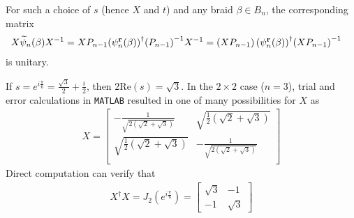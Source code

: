 For such a choice of $s$ (hence $X$ and $t$) and any braid $\beta\in B_n$, the corresponding matrix
\begin{align*}
    X\widetilde{\psi}_n(\beta){ X }^{-1} &= X P_{n-1}{\left(\psi_n^\mathbf{r}(\beta)\right)}^\dagger{ \left( P_{n-1} \right) }^{-1}{ X }^{-1} = \left( X P_{n-1} \right){\left(\psi_n^\mathbf{r}(\beta)\right)}^\dagger{ \left( X P_{n-1} \right) }^{-1}
\end{align*}
is unitary.

\begin{example}\label{ex:unitary}
    If $s=e^{i\frac{\pi}{6}}=\frac{\sqrt{3}}{2} + \frac{i}{2}$, then $2\textrm{Re}(s) = \sqrt{3}$. In the $2\times 2$ case ($n=3$), trial and error calculations in \texttt{MATLAB} resulted in one of many possibilities for $X$ as
    \begin{align*}
        X = \left[
            \begin{array}{cc}
            -\frac{1}{\sqrt{2 \left(\sqrt{2}+\sqrt{3}\right)}} & \sqrt{\frac{1}{2} \left(\sqrt{2}+\sqrt{3}\right)} \\
            \sqrt{\frac{1}{2} \left(\sqrt{2}+\sqrt{3}\right)} & -\frac{1}{\sqrt{2 \left(\sqrt{2}+\sqrt{3}\right)}} \\
            \end{array}
            \right]
    \end{align*}
    Direct computation can verify that
    \begin{align*}
        X^\dagger X = J_{2}(e^{i\frac{\pi}{6}}) = \left[\begin{array}{cc} \sqrt{3} & -1\\ -1 & \sqrt{3} \end{array}\right]
    \end{align*}


\end{example}
